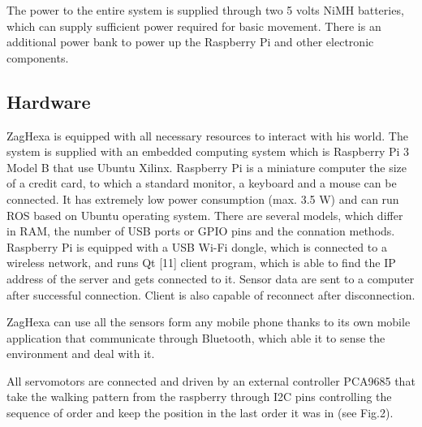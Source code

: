 \documentclass[conference]{IEEEtran}
\begin{document}
The power to the entire system is supplied through two 5 volts NiMH batteries, which can supply sufficient power required for basic movement. There is an additional power bank to power up the Raspberry Pi and other electronic components. 

\subsection{Hardware}
ZagHexa is equipped with all necessary resources to interact with his world. The system is supplied with an embedded computing system which is Raspberry Pi 3 Model B that use Ubuntu Xilinx.  Raspberry Pi is a miniature computer the size of a credit card, to which a standard monitor, a keyboard and a mouse can be connected. It has extremely low power consumption (max. 3.5 W) and can run ROS based on Ubuntu operating system. There are several models, which differ in RAM, the number of USB ports or GPIO pins and the connation methods. Raspberry Pi is equipped with a USB Wi-Fi dongle, which is connected to a wireless network, and runs Qt [11] client program, which is able to find the IP address of the server and gets connected to it. Sensor data are sent to a computer after successful connection. Client is also capable of reconnect after disconnection.

ZagHexa can use all the sensors form any mobile phone thanks to its own mobile application that communicate through Bluetooth, which able it to sense the environment and deal with it. 

All servomotors are connected and driven by an external controller PCA9685 that take the walking pattern from the raspberry through I2C pins controlling the sequence of order and keep the position in the last order it was in (see Fig.2).
\end{document}
